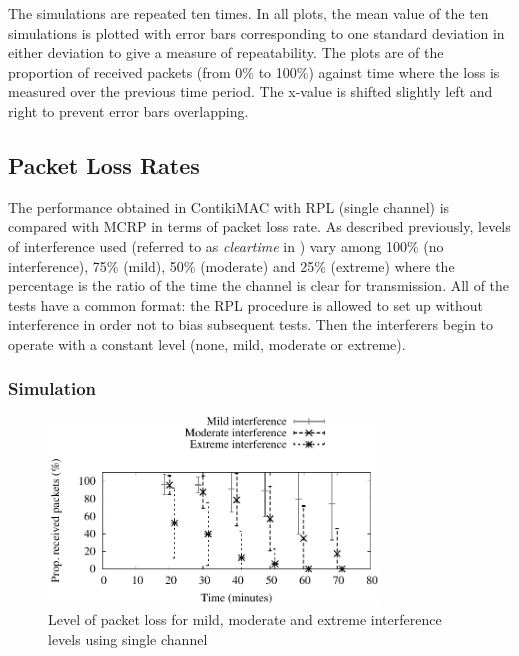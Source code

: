 
The simulations are repeated ten times. In all plots, the mean value of the ten simulations is plotted with error bars corresponding to one standard deviation in either deviation to give a measure of repeatability. The plots are of the proportion of received packets (from 0\% to 100\%) against time where the loss is measured over the previous time period.  The x-value is shifted slightly left and right to prevent error bars overlapping.

\subsection{Packet Loss Rates}
The performance obtained in ContikiMAC with RPL (single channel) is compared with MCRP in terms of packet loss rate.
As described previously, levels of interference used (referred to as \emph{clear\textunderscore time} in \cite{interferenceModel}) vary among 100\% (no interference), 75\% (mild), 50\% (moderate) and 25\% (extreme) where the percentage is the ratio of the time the channel is clear for transmission.  All of the tests have a common format: the RPL procedure is allowed to set up without interference in order not to bias subsequent tests.
Then the interferers begin to operate with a constant level (none, mild, moderate or extreme).

\subsubsection{Simulation}

\begin{figure}
\centering
\includegraphics[width=0.78\textwidth]{single_channel.pdf}
\caption{Level of packet loss for mild, moderate and extreme interference levels using single channel}
\label{fig:interference}
\end{figure}

